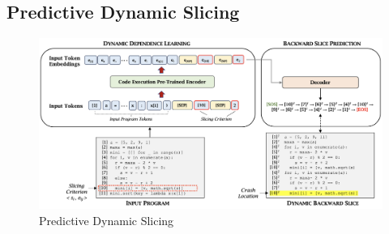 
\subsection{Predictive Dynamic Slicing}

\begin{figure}[t]
\begin{center}
\includegraphics[width=5in]{dynamic-slicing.png}
\vspace{-12pt}
\caption{Predictive Dynamic Slicing}
\label{fig:dynamic-slicing}
\end{center}
\end{figure}


